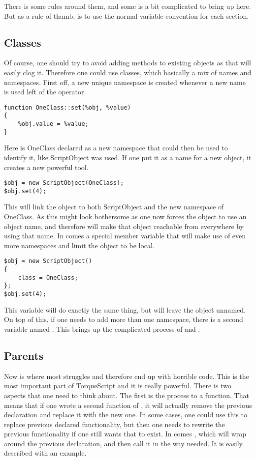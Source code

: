 There is some rules around them, and some is a bit complicated to bring up here. But as a rule of thumb, is to use the normal variable convention for each section.

\subsection{Classes}

Of course, one should try to avoid adding methods to existing objects as that will easily clog it. Therefore one could use classes, which basically a mix of names and namespaces. First off, a new unique namespace is created whenever a new name is used left of the operator.

\begin{lstlisting}[style=ts]
function OneClass::set(%obj, %value)
{
	%obj.value = %value;
}
\end{lstlisting}

Here is OneClass declared as a new namespace that could then be used to identify it, like ScriptObject was used. If one put it as a name for a new object, it creates a new powerful tool.

\begin{lstlisting}[style=ts]
$obj = new ScriptObject(OneClass);
$obj.set(4);
\end{lstlisting}

This will link the object to both ScriptObject and the new namespace of OneClass. As this might look bothersome as one now forces the object to use an object name, and therefore will make that object reachable from everywhere by using that name. In comes a special member variable that will make use of even more namespaces and limit the object to be local.

\begin{lstlisting}[style=ts]
$obj = new ScriptObject()
{
	class = OneClass;
};
$obj.set(4);
\end{lstlisting}

This variable will do exactly the same thing, but will leave the object unnamed. On top of this, if one needs to add more than one namespace, there is a second variable named . This brings up the complicated process of  and .

\subsection{Parents}

Now is where most struggles and therefore end up with horrible code. This is the most important part of TorqueScript and it is really powerful. There is two aspects that one need to think about. The first is the process to  a function. That means that if one wrote a second function of , it will actually remove the previous declaration and replace it with the new one. In some cases, one could use this to replace previous declared functionality, but then one needs to rewrite the previous functionality if one still wants that to exist.
In comes , which will wrap around the previous declaration, and then call it in the way needed. It is easily described with an example.

